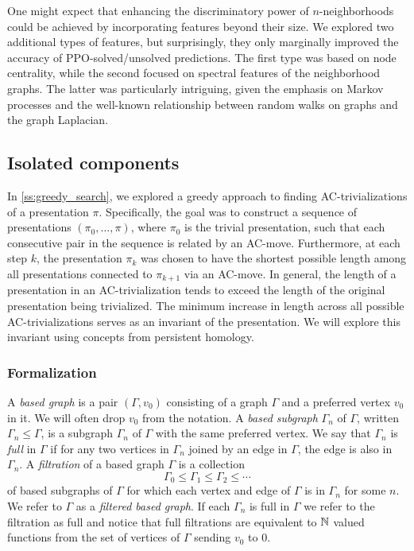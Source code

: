 \medskip

One might expect that enhancing the discriminatory power of \(n\)-neighborhoods could be achieved by incorporating features beyond their size.
We explored two additional types of features, but surprisingly, they only marginally improved the accuracy of PPO-solved/unsolved predictions.
The first type was based on node centrality, while the second focused on spectral features of the neighborhood graphs.
The latter was particularly intriguing, given the emphasis on Markov processes and the well-known relationship between random walks on graphs and the graph Laplacian.


\subsection{Isolated components}

In \autoref{ss:greedy_search}, we explored a greedy approach to finding AC-trivializations of a presentation \(\pi\).
Specifically, the goal was to construct a sequence of presentations \((\pi_0, \dots, \pi)\), where \(\pi_0\) is the trivial presentation, such that each consecutive pair in the sequence is related by an AC-move.
Furthermore, at each step \(k\), the presentation \(\pi_k\) was chosen to have the shortest possible length among all presentations connected to \(\pi_{k+1}\) via an AC-move.
In general, the length of a presentation in an AC-trivialization tends to exceed the length of the original presentation being trivialized.
The minimum increase in length across all possible AC-trivializations serves as an invariant of the presentation.
We will explore this invariant using concepts from persistent homology.

\subsubsection{Formalization}

A \textit{based graph} is a pair $(\Gamma, v_0)$ consisting of a graph $\Gamma$ and a preferred vertex $v_0$ in it.
We will often drop $v_0$ from the notation.
A \textit{based subgraph} $\Gamma_n$ of $\Gamma$, written $\Gamma_n \leq \Gamma$, is a subgraph $\Gamma_n$ of $\Gamma$ with the same preferred vertex.
We say that $\Gamma_n$ is \textit{full} in $\Gamma$ if for any two vertices in $\Gamma_n$ joined by an edge in $\Gamma$, the edge is also in $\Gamma_n$.
A \textit{filtration} of a based graph $\Gamma$ is a collection
\[
\Gamma_0 \leq \Gamma_1 \leq \Gamma_2 \leq \dotsb
\]
of based subgraphs of $\Gamma$ for which each vertex and edge of $\Gamma$ is in $\Gamma_n$ for some $n$.
We refer to $\Gamma$ as a \textit{filtered based graph}.
If each $\Gamma_n$ is full in $\Gamma$ we refer to the filtration as full and notice that full filtrations are equivalent to $\mathbb{N}$ valued functions from the set of vertices of $\Gamma$ sending $v_0$ to $0$.

